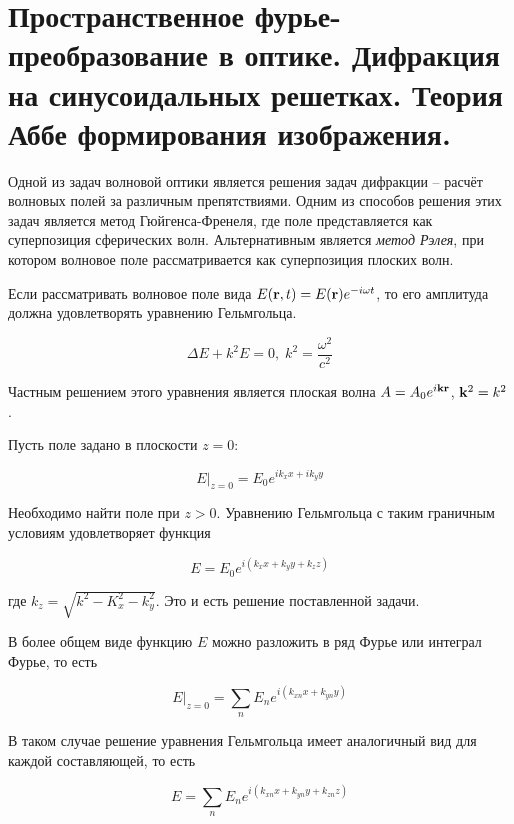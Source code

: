 \section{Пространственное фурье-преобразование в оптике. Дифракция на синусоидальных решетках. Теория Аббе формирования изображения.}

Одной из задач волновой оптики является решения задач дифракции -- расчёт волновых полей за различным препятствиями. Одним из способов решения этих задач является метод Гюйгенса-Френеля, где поле представляется как суперпозиция сферических волн. Альтернативным является \textit{метод Рэлея}, при котором волновое поле рассматривается как суперпозиция плоских волн.

Если рассматривать волновое поле вида $E(\mathbf r, t) = E(\mathbf r) e^{-i \omega t}$, то его амплитуда должна удовлетворять уравнению Гельмгольца.

\begin{equation}
    \Delta E + k^2 E = 0, \; k^2 = \frac{\omega^2}{c^2}
\end{equation}

\noindent
Частным решением этого уравнения является плоская волна $A = A_0 e^{i \mathbf k \mathbf r}$, $\mathbf k^2 = k^2$.

Пусть поле задано в плоскости $z = 0$:

\begin{equation}
    E |_{z = 0} = E_0 e^{i k_x x + i k_y y}
\end{equation}

\noindent
Необходимо найти поле при $z > 0$. Уравнению Гельмгольца с таким граничным условиям удовлетворяет функция

\begin{equation}
    E = E_0 e^{i \left( k_x x + k_y y + k_z z \right)}
\end{equation}

\noindent
где $k_z = \sqrt{k^2 - K_x^2 - k_y^2}$. Это и есть решение поставленной задачи.

В более общем виде функцию $E$ можно разложить в ряд Фурье или интеграл Фурье, то есть

\begin{equation}
    E |_{z = 0} = \sum_n E_n e^{i \left( k_{x n} x + k_{y n} y \right)}
\end{equation}

\noindent
В таком случае решение уравнения Гельмгольца имеет аналогичный вид для каждой составляющей, то есть

\begin{equation}
    E = \sum_n E_n e^{i \left( k_{x n} x + k_{y n} y + k_{z n} z \right)}
\end{equation}

